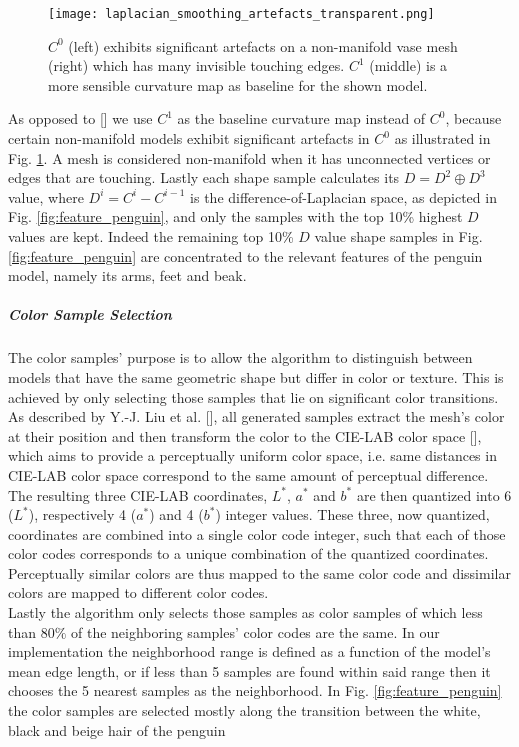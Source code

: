 \begin{figure}
\centering
\captionsetup{width=0.8\textwidth}
\texttt{[image: laplacian\_smoothing\_artefacts\_transparent.png]}
\caption{$C^0$ (left) exhibits significant artefacts on a non-manifold vase mesh (right) which has many invisible touching edges. $C^1$ (middle) is a more sensible curvature map as baseline for the shown model.}
\label{fig:laplacian_smoothing_artefacts}
\end{figure}

As opposed to [] we use
$C^1$ as the baseline curvature map instead of $C^0$, because certain non-manifold models exhibit significant artefacts in $C^0$ as illustrated in Fig. \ref{fig:laplacian_smoothing_artefacts}. A mesh is considered non-manifold when it has unconnected vertices or edges that are touching. Lastly each shape sample calculates its $D = D^2 \oplus D^3$ value, where $D^i = C^i - C^{i-1}$ is the difference-of-Laplacian space, as depicted in Fig. \ref{fig:feature_penguin}, and only the samples with the top 10\% highest $D$ values are kept. Indeed the remaining top
10\% $D$ value shape samples in Fig. \ref{fig:feature_penguin} are concentrated to the relevant features of the penguin model, namely its arms, feet and beak.

\subparagraph{Color Sample Selection}

The color samples' purpose is to allow the algorithm to distinguish between models that have the same geometric shape but differ in
color or texture. This is achieved by only selecting those samples that lie on significant color transitions. As described by
Y.-J. Liu et al. [], all generated samples extract the mesh's color at their position and then transform
the color to the CIE-LAB color space [], which aims to provide a perceptually uniform color space, i.e. same distances in CIE-LAB color space correspond to the same amount of perceptual difference.
The resulting three CIE-LAB coordinates, $L^*$, $a^*$ and $b^*$ are then quantized into 6 ($L^*$), respectively 4 ($a^*$) and 4 ($b^*$) integer values. These three, now quantized, coordinates are combined into a single color code integer, such that each of those color codes corresponds to a unique combination of the quantized coordinates. Perceptually similar colors are thus mapped to the same color code and dissimilar colors are mapped to different color codes.\\
Lastly the algorithm only selects those samples as color samples of which less than $80\%$ of the neighboring samples' color codes are the same. In our implementation the neighborhood range is defined as a function of the model's mean edge length, or if less than 5 samples are found within said range then it chooses the 5 nearest samples as the neighborhood. In Fig. \ref{fig:feature_penguin} the
color samples are selected mostly along the transition between the white, black and beige hair of the penguin

